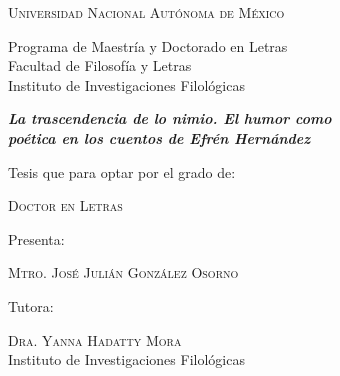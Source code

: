 \documentclass[14pt,twoside,final]{extbook} %
\begin{document}
\setcounter{page}{1}
\parindent=5mm %
\parskip=0mm %
\newpage
\pagestyle{empty}
\BgThispage
\hspace*{0pt}
\vspace*{18pt}
\begin{center}
\large\scshape Universidad Nacional Autónoma de México
\end{center}
\begin{center}
\large Programa de Maestría y Doctorado en Letras \\

Facultad de Filosofía y Letras \\

Instituto de Investigaciones Filológicas
\end{center}
\smallskip
\begin{center}
\large\itshape\bfseries La trascendencia de lo nimio. El humor como \\ poética en los cuentos de Efrén Hernández
\end{center}
\smallskip
\begin{center}
\large Tesis que para optar por el grado de:
\end{center}
\begin{center}
\large\scshape Doctor en Letras
\end{center}
\begin{center}
\large Presenta:
\end{center}
\begin{center}
\large\scshape Mtro. José Julián González Osorno
\end{center}
\begin{center}
\large Tutora:
\end{center}
\begin{center}
\large\textsc{Dra. Yanna Hadatty Mora} \\

Instituto de Investigaciones Filológicas
\end{center}
\end{document}
